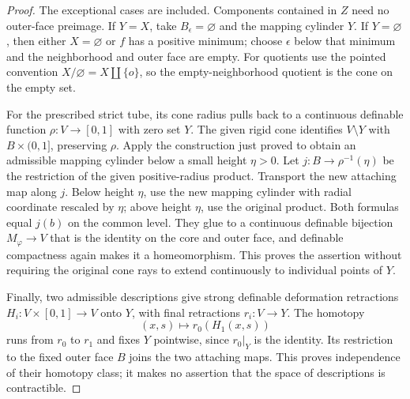 \begin{proof}
The exceptional cases are included.  Components contained in $Z$
need no outer-face preimage.  If $Y=X$, take $B_\epsilon=\varnothing$
and the mapping cylinder $Y$.  If $Y=\varnothing$, then either
$X=\varnothing$ or $f$ has a positive minimum; choose $\epsilon$
below that minimum and the neighborhood and outer face are empty.
For quotients use the pointed convention $X/\varnothing=X\amalg\{o\}$,
so the empty-neighborhood quotient is the cone on the empty set.

For the prescribed strict tube, its cone radius pulls back to a
continuous definable function $\rho:V\to[0,1]$ with zero set $Y$.
The given rigid cone identifies $V\setminus Y$ with
$B\times(0,1]$, preserving $\rho$.  Apply the construction just
proved to obtain an admissible mapping cylinder below a small
height $\eta>0$.  Let $j:B\to\rho^{-1}(\eta)$ be the restriction
of the given positive-radius product.  Transport the new attaching
map along $j$.  Below height $\eta$, use the new mapping cylinder
with radial coordinate rescaled by $\eta$; above height $\eta$,
use the original product.  Both formulas equal $j(b)$ on the
common level.  They glue to a continuous definable bijection
$M_\varphi\to V$ that is the identity on the core and outer face,
and definable compactness again makes it a homeomorphism.
This proves the assertion without requiring the original cone
rays to extend continuously to individual points of $Y$.

Finally, two admissible descriptions give strong definable
deformation retractions $H_i:V\times[0,1]\to V$ onto $Y$,
with final retractions $r_i:V\to Y$.  The homotopy
\[
 (x,s)\longmapsto r_0(H_1(x,s))
\]
runs from $r_0$ to $r_1$ and fixes $Y$ pointwise, since
$r_0|_Y$ is the identity.  Its restriction to the fixed outer
face $B$ joins the two attaching maps.  This proves independence
of their homotopy class; it makes no assertion that the space of
descriptions is contractible.
\end{proof}
